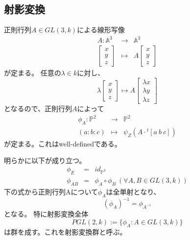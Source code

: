 \documentclass[a4]{article}
\newcommand{\affine}{\mathbb{A}}
\newcommand{\proj}{\mathbb{P}}
\begin{document}
    \subsection{射影変換}
    正則行列$A \in GL(3, k)$による線形写像
    \begin{eqnarray*}
        A : \affine^3 &\to& \affine^3 \\
        \begin{bmatrix}
            x \\ y \\ z
        \end{bmatrix}
        &\mapsto&
        A
        \begin{bmatrix}
            x \\ y \\ z
        \end{bmatrix}
    \end{eqnarray*}
    が定まる。
    任意の$\lambda  \in k$に対し、
    \[
        \lambda
        \begin{bmatrix}
            x \\ y \\ z
        \end{bmatrix}
        \mapsto
        A
        \begin{bmatrix}
            \lambda x \\ \lambda y \\ \lambda z
        \end{bmatrix}
    \]
    となるので、正則行列$A$によって
    \begin{eqnarray*}
        \phi_{A} : \proj^2 &\to& \proj^2 \\
        (a:b:c) &\mapsto& \psi_{Z}(A \cdot {}^t[a~b~c])
    \end{eqnarray*}
    が定まる。これはwell-definedである。

    明らかに以下が成り立つ。
    \begin{eqnarray*}
        \phi_{E} &=& id_{\proj^2} \\
        \phi_{AB} &=& \phi_{A} \circ \phi_{B} ~(\forall A, B \in GL(3,k))
    \end{eqnarray*}
    下の式から正則行列Aについて$\phi_A$は全単射となり、
    \[ (\phi_A)^{-1}=\phi_{A^{-1}} \]となる。
    特に射影変換全体
    \[ PGL(2, k):=\{ \phi_A : A \in GL(3,k) \} \]
    は群を成す。これを射影変換群と呼ぶ。
\end{document}

